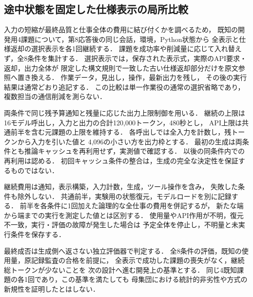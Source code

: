 \subsection{途中状態を固定した仕様表示の局所比較}
入力の短縮が最終品質と仕事全体の費用に結び付くかを調べるため，
既知の開発用4課題について，第8応答後の同じ会話，環境，Python状態から
全表示と仕様返却の選択表示を各1回継続する．
課題を成功率や削減量に応じて入れ替えず，全8条件を集計する．
選択表示では，保存された表示式，実際のAPI要求・返却，出力全体が
限定した構文規則で一致した古い仕様返却部分だけを原文参照へ置き換える．
作業データ，見出し，操作，最新出力を残し，
その後の実行結果は通常どおり追記する．
この比較は単一作業役の通常の選択省略であり，複数担当の通信削減を測らない．

両条件で同じ残予算通知と残量に応じた出力上限制御を用いる．
継続の上限は16モデル呼出し，入力と出力の合計120,000トークン，480秒とし，
API上限は共通前半を含む元課題の上限を維持する．
各呼出しでは全入力を計数し，残トークンから入力を引いた値と
4,096の小さい方を出力枠とする．
最初の生成は両条件とも推論キャッシュを再利用せず，実測値で確認する．
以後の同条件内での再利用は認める．
初回キャッシュ条件の整合は，生成の完全な決定性を保証するものではない．

継続費用は通知，表示構築，入力計数，生成，ツール操作を含み，
失敗した条件も除外しない．
共通前半，実験用の状態復元，モデルロードを別に記録する．
前半を各条件に1回加えた論理的な全仕事の費用を併記するが，
新たな端から端までの実行を測定した値とは区別する．
使用量やAPI作用が不明，復元不一致，実行・評価の故障が発生した場合は
予定全体を停止し，不明量と未実行条件を保存する．

最終成否は生成側へ返さない独立評価器で判定する．
全8条件の評価，既知の使用量，原記録監査の合格を前提に，
全表示で成功した課題の喪失がなく，継続総トークンが少ないことを
次の設計へ進む開発上の基準とする．
同じ4既知課題の各1回であり，この基準を満たしても
母集団における統計的非劣性や方式の新規性を証明したとはしない．
